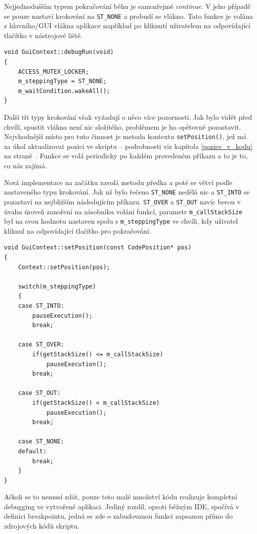 \documentclass[11pt,twoside,a4paper]{book}
\begin{document}
Nejjednodušším typem pokračování běhu je samozřejmě \textit{continue}. V jeho případě se pouze nastaví krokování na \texttt{ST\_NONE} a probudí se vlákno. Tato funkce je volána z hlavního/GUI vlákna aplikace například po kliknutí uživatelem na odpovídající tlačítko v nástrojové liště.

\begin{verbatim}
void GuiContext::debugRun(void)
{
    ACCESS_MUTEX_LOCKER;
    m_steppingType = ST_NONE;
    m_waitCondition.wakeAll();
}
\end{verbatim}

Další tři typy krokování však vyžadují o něco více pozornosti. Jak bylo vidět před chvílí, spustit vlákno není nic složitého, problémem je ho opětovně pozastavit. Nejvhodnější místo pro tuto činnost je metoda kontextu \texttt{setPosition()}, jež má za úkol aktualizovat pozici ve skriptu -- podrobnosti viz kapitola \ref{pozice_v_kodu} na straně~\pageref{pozice_v_kodu}. Funkce se volá periodicky po každém provedeném příkazu a to je to, co nás zajímá.

Nová implementace na začátku zavolá metodu předka a poté se větví podle nastaveného typu krokování. Jak už bylo řečeno \texttt{ST\_NONE} nedělá nic a \texttt{ST\_INTO} se pozastaví na nejbližším následujícím příkazu. \texttt{ST\_OVER} a \texttt{ST\_OUT} navíc berou v úvahu úroveň zanoření na zásobníku volání funkcí, parametr \texttt{m\_callStackSize} byl na svou hodnotu nastaven spolu s \texttt{m\_steppingType} ve chvíli, kdy uživatel kliknul na odpovídající tlačítko pro pokračování.

\begin{verbatim}
void GuiContext::setPosition(const CodePosition* pos)
{
    Context::setPosition(pos);

    switch(m_steppingType)
    {
    case ST_INTO:
        pauseExecution();
        break;

    case ST_OVER:
        if(getStackSize() <= m_callStackSize)
            pauseExecution();
        break;

    case ST_OUT:
        if(getStackSize() < m_callStackSize)
            pauseExecution();
        break;

    case ST_NONE:
    default:
        break;
    }
}
\end{verbatim}

Ačkoli se to nemusí zdát, pouze toto malé množství kódu realizuje kompletní debugging ve vytvořené aplikaci. Jediný rozdíl, oproti běžným IDE, spočívá v definici breakpointu, jedná se zde o zabudovanou funkci zapsanou přímo do zdrojových kódů skriptu.
\end{document}
